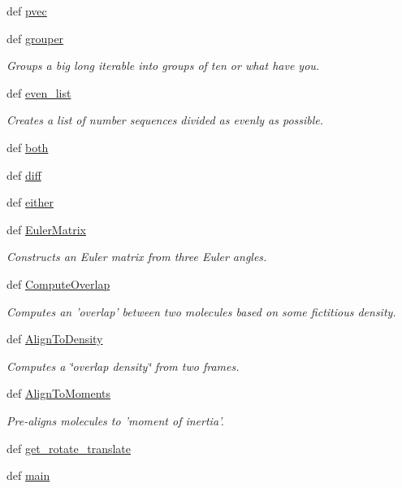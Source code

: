 \begin{DoxyCompactItemize}
\item 
def \hyperlink{namespaceforcebalance_1_1molecule_a58c3f09152db4d1c6e1db9df29c60c43}{pvec}
\item 
def \hyperlink{namespaceforcebalance_1_1molecule_a7fe52c2928c7b0329882541bef2e34cd}{grouper}
\begin{DoxyCompactList}\small\item\em Groups a big long iterable into groups of ten or what have you. \end{DoxyCompactList}\item 
def \hyperlink{namespaceforcebalance_1_1molecule_a5f529179461765fadbd0a742cdc2c677}{even\-\_\-list}
\begin{DoxyCompactList}\small\item\em Creates a list of number sequences divided as evenly as possible. \end{DoxyCompactList}\item 
def \hyperlink{namespaceforcebalance_1_1molecule_a5b50df23cc4d0e617fdc56538f0bea63}{both}
\item 
def \hyperlink{namespaceforcebalance_1_1molecule_a6f7c6217b1c64da309a8abd21dfdcf08}{diff}
\item 
def \hyperlink{namespaceforcebalance_1_1molecule_a75775be6563ad7f10695a9a45ff49ba9}{either}
\item 
def \hyperlink{namespaceforcebalance_1_1molecule_af02bf73765f34bbef81c4a5b000b86ce}{Euler\-Matrix}
\begin{DoxyCompactList}\small\item\em Constructs an Euler matrix from three Euler angles. \end{DoxyCompactList}\item 
def \hyperlink{namespaceforcebalance_1_1molecule_a8fcbb4a2b3470a85d25699b6f28a54fc}{Compute\-Overlap}
\begin{DoxyCompactList}\small\item\em Computes an 'overlap' between two molecules based on some fictitious density. \end{DoxyCompactList}\item 
def \hyperlink{namespaceforcebalance_1_1molecule_a9a58eb1746e51420f50da3f3a6d51485}{Align\-To\-Density}
\begin{DoxyCompactList}\small\item\em Computes a \char`\"{}overlap density\char`\"{} from two frames. \end{DoxyCompactList}\item 
def \hyperlink{namespaceforcebalance_1_1molecule_aa9ad9b92efa7bd3c1d589d62bbb8108e}{Align\-To\-Moments}
\begin{DoxyCompactList}\small\item\em Pre-\/aligns molecules to 'moment of inertia'. \end{DoxyCompactList}\item 
def \hyperlink{namespaceforcebalance_1_1molecule_a08840b73e95bf34bf9ca7ea36ad0492d}{get\-\_\-rotate\-\_\-translate}
\item 
def \hyperlink{namespaceforcebalance_1_1molecule_ab9cb167fbbd809aedcf8c7434d405547}{main}
\end{DoxyCompactItemize}
